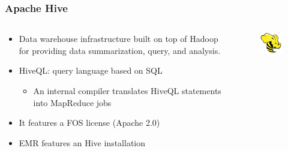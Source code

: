 \documentclass[hyperref={pdfpagelabels=true}]{beamer}
\begin{document}
\begin{frame}
\frametitle{Apache Hive}
\begin{columns}
  \begin{column}{0.8\textwidth}
    \begin{itemize}
      \item<1->Data warehouse infrastructure built on top of Hadoop for providing data summarization, query, and analysis.%
      \item<3->HiveQL: query language based on SQL%
      \begin{itemize}
	\item<2->An internal compiler translates HiveQL statements into MapReduce jobs
      \end{itemize}          
      \item<3->It features a FOS license (Apache 2.0)
      \item<4->EMR features an Hive installation
    \end{itemize}    
  \end{column}
  \begin{column}{0.2\textwidth}
      \begin{figure}  
	\includegraphics[width=\textwidth]{hive2.png}
       \end{figure}  
  \end{column}  
\end{columns}
\end{frame}
\end{document}
